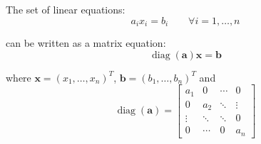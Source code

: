 \documentclass{scrartcl}
\renewcommand*{\vec}[1]{\boldsymbol{#1}}
\DeclareMathOperator{\diag}{diag}
\begin{document}
The set of linear equations:
\[
    a_ix_i = b_i \qquad \forall i=1,\ldots,n
\]

can be written as a matrix equation:
\[
    \diag(\vec{a})\vec{x} = \vec{b}
\]

where \(\vec{x} = (x_1, \dotsc, x_n)^T\), \(\vec{b} = (b_1, \dotsc, b_n)^T\) and
\[
    \diag(\vec{a}) = 
    \begin{bmatrix}
        a_1 & 0 & \cdots & 0\\
        0 & a_2 & \ddots & \vdots\\
        \vdots & \ddots & \ddots & 0\\
        0 & \cdots & 0 & a_n
    \end{bmatrix}
\]
\end{document}
